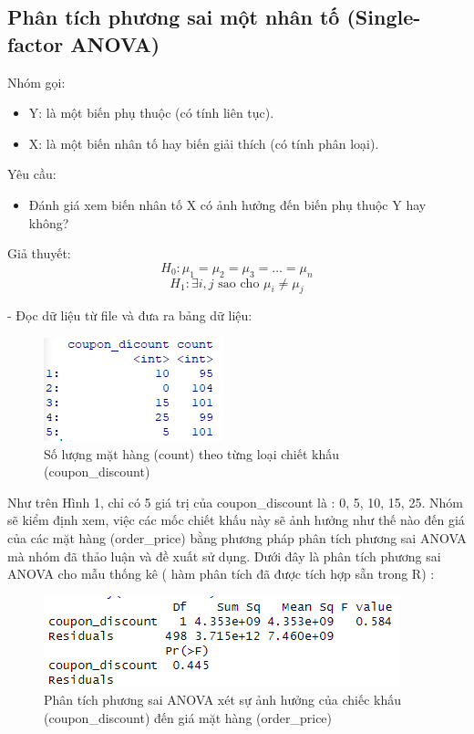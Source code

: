 \subsection{Phân tích phương sai một nhân tố (Single-factor ANOVA)}


Nhóm gọi:
\begin{itemize}
    \item Y: là một biến phụ thuộc (có tính liên tục).
    \item X: là một biến nhân tố hay biến giải thích (có tính phân loại).
\end{itemize}

Yêu cầu:
\begin{itemize}
    \item Đánh giá xem biến nhân tố X có ảnh hưởng đến biến phụ thuộc Y hay không?
\end{itemize}
Giả thuyết:
  \[
  H_{0}: \mu_{1} = \mu_{2} = \mu_{3} = \dots = \mu_{n}
  \]
  \[
  H_{1}: \exists i, j \text{ sao cho } \mu_{i} \neq \mu_{j}
  \]

- Đọc dữ liệu từ file và đưa ra bảng dữ liệu:


\begin{figure}[!htbp]
    \centering
    \includegraphics[width=0.4\linewidth]{graphics/5.3.1.png}
    \caption{Số lượng mặt hàng (count) theo từng loại chiết khấu (coupon\_discount)}
\end{figure}

Như trên Hình 1, chỉ có 5 giá trị của coupon\_discount là : 0, 5, 10, 15, 25. Nhóm sẽ kiểm định xem, việc các mốc chiết khấu này sẽ ảnh hưởng như thế nào đến giá của các mặt hàng (order\_price) bằng phương pháp phân tích phương sai ANOVA mà nhóm đã thảo luận và đề xuất sử dụng. Dưới đây là phân tích phương sai ANOVA cho mẫu thống kê ( hàm phân tích đã được tích hợp sẵn trong R) :

\begin{figure}[!htbp]
    \centering
    \includegraphics[width=0.4\linewidth]{graphics/5.3.2.png}
    \caption{Phân tích phương sai ANOVA xét sự ảnh hưởng của chiếc khấu (coupon\_discount) đến giá mặt hàng (order\_price)}
\end{figure}

